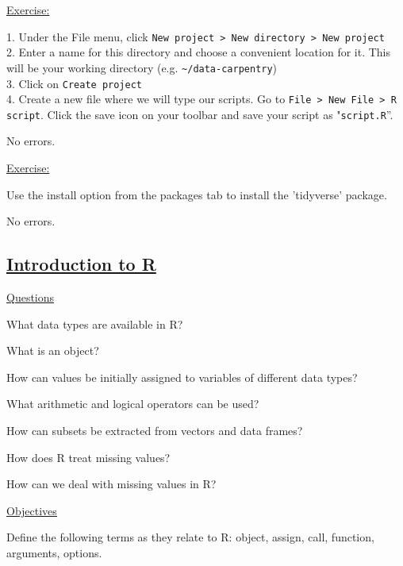 \documentclass[12pt]{article}
\begin{document}
\vspace{0.5em}
\begin{addmargin}[1cm]{0cm}
\color{gray}
\underline{Exercise:}

1. Under the File menu, click \texttt{New project > New directory > New project}
\\2. Enter a name for this directory and choose a convenient location for it. This will be your working directory (e.g. \texttt{\textasciitilde/data-carpentry})
\\3. Click on \texttt{Create project}
\\4. Create a new file where we will type our scripts. Go to \texttt{File > New File > R script}. Click the save icon on your toolbar and save your script as "\texttt{script.R}”.

\color{black}\vspace{0.5em}

No errors.

\vspace{0.5em}
\color{gray}
\underline{Exercise:}

Use the install option from the packages tab to install the 'tidyverse' package.

\color{black}\vspace{0.5em}

No errors.
\end{addmargin}

\newpage\subsection{\href{https://datacarpentry.org/r-socialsci/01-intro-to-r/index.html}{Introduction to R}}

\color{gray}
\underline{Questions}

What data types are available in R?

What is an object?

How can values be initially assigned to variables of different data types?

What arithmetic and logical operators can be used?

How can subsets be extracted from vectors and data frames?

How does R treat missing values?

How can we deal with missing values in R?

\underline{Objectives}

Define the following terms as they relate to R: object, assign, call, function, arguments, options.
\end{document}
